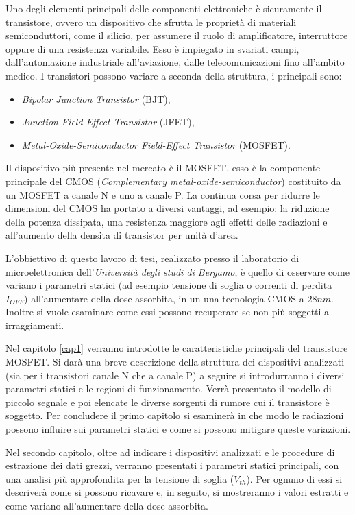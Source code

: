 Uno degli elementi principali delle componenti elettroniche è sicuramente il transistore, ovvero un dispositivo che sfrutta le proprietà di materiali semiconduttori, come il silicio, per assumere il ruolo di amplificatore, interruttore oppure di una resistenza variabile.
Esso è impiegato in svariati campi, dall'automazione industriale all'aviazione, dalle telecomunicazioni fino all'ambito medico.
I transistori possono variare a seconda della struttura, i principali sono:
\begin{itemize}
    \item \textit{Bipolar Junction Transistor} (BJT),
    \item \textit{Junction Field-Effect Transistor} (JFET),
    \item \textit{Metal-Oxide-Semiconductor Field-Effect Transistor} (MOSFET).
\end{itemize}
Il dispositivo più presente nel mercato è il MOSFET, esso è la componente principale del CMOS (\textit{Complementary metal-oxide-semiconductor}) costituito da un MOSFET a canale N e uno a canale P. La continua corsa per ridurre le dimensioni del CMOS ha portato a diversi vantaggi, ad esempio: la riduzione della potenza dissipata, una resistenza maggiore agli effetti delle radiazioni e all'aumento della densita di transistor per unità d'area.  

\vspace*{0.5cm}

L'obbiettivo di questo lavoro di tesi, realizzato presso il laboratorio di microelettronica dell'\textit{Università degli studi di Bergamo}, è quello di osservare come variano i parametri statici (ad esempio tensione di soglia o correnti di perdita $I_{OFF}$) all'aumentare della dose assorbita, in un una tecnologia CMOS a $28nm$. Inoltre si vuole esaminare come essi possono recuperare se non più soggetti a irraggiamenti.     

\vspace*{0.5cm}

Nel capitolo \ref{cap1} verranno introdotte le caratteristiche principali del transistore MOSFET.
Si darà una breve descrizione della struttura dei dispositivi analizzati (sia per i transistori canale N che a canale P) a seguire si introdurranno i diversi parametri statici e le regioni di funzionamento. Verrà presentato il modello di piccolo segnale e poi elencate le diverse sorgenti di rumore cui il transistore è soggetto. Per concludere il \hyperref[cap1]{primo} capitolo si esaminerà in che modo le radiazioni possono influire sui parametri statici e come si possono mitigare queste variazioni.

Nel \hyperref[cap2]{secondo} capitolo, oltre ad indicare i dispositivi analizzati e le procedure di estrazione dei dati grezzi, verranno presentati i parametri statici principali, con una analisi più approfondita per la tensione di soglia ($V_{th}$). Per ognuno di essi si descriverà come si possono ricavare e, in seguito, si mostreranno i valori estratti e come variano all'aumentare della dose assorbita.   
